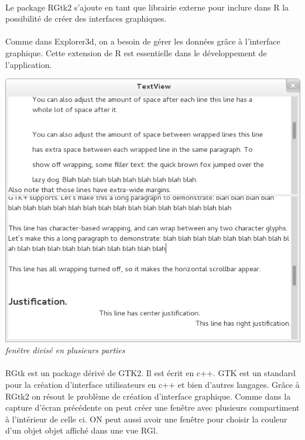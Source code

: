 \paragraph{}
Le package RGtk2 s'ajoute en tant que librairie externe pour inclure dans R la possibilité de créer des interfaces graphiques. 

\paragraph{}
Comme dans Explorer3d, on a besoin de gérer les données grâce à l'interface graphique. Cette extension de R est essentielle dans le développement de l'application. 

 \begin{center}
\includegraphics[scale=0.4]{multipleviews.png}\\
\textit{fenêtre divisé en plusieurs parties}
\end{center}

\paragraph{}
RGtk est un package dérivé de GTK2. Il est écrit en c++. GTK est un standard pour la création d'interface utilisateurs en c++ et bien d'autres langages. Grâce à RGtk2 on résout le problème de création d'interface graphique. Comme dans la capture d'écran précédente on peut créer une fenêtre avec plusieurs compartiment à l'intérieur de celle ci. ON peut aussi avoir une fenêtre pour choisir la couleur d'un objet objet affiché dans une vue RGl. 

